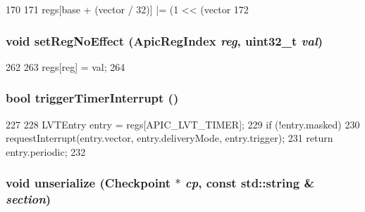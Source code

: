 \begin{DoxyCode}
170     {
171         regs[base + (vector / 32)] |= (1 << (vector %
172     }
\end{DoxyCode}
\hypertarget{classX86ISA_1_1Interrupts_aa35a02e092cafc6be88b0eb6afe22937}{
\subsubsection[{setRegNoEffect}]{\setlength{\rightskip}{0pt plus 5cm}void setRegNoEffect ({\bf ApicRegIndex} {\em reg}, \/  {\bf uint32\_\-t} {\em val})}}
\label{classX86ISA_1_1Interrupts_aa35a02e092cafc6be88b0eb6afe22937}



\begin{DoxyCode}
262     {
263         regs[reg] = val;
264     }
\end{DoxyCode}
\hypertarget{classX86ISA_1_1Interrupts_a07d266f0ad36cfec987f7487aa2c54cc}{
\subsubsection[{triggerTimerInterrupt}]{\setlength{\rightskip}{0pt plus 5cm}bool triggerTimerInterrupt ()}}
\label{classX86ISA_1_1Interrupts_a07d266f0ad36cfec987f7487aa2c54cc}



\begin{DoxyCode}
227     {
228         LVTEntry entry = regs[APIC_LVT_TIMER];
229         if (!entry.masked)
230             requestInterrupt(entry.vector, entry.deliveryMode, entry.trigger);
231         return entry.periodic;
232     }
\end{DoxyCode}
\hypertarget{classX86ISA_1_1Interrupts_af22e5d6d660b97db37003ac61ac4ee49}{
\subsubsection[{unserialize}]{\setlength{\rightskip}{0pt plus 5cm}void unserialize ({\bf Checkpoint} $\ast$ {\em cp}, \/  const std::string \& {\em section})}}
\label{classX86ISA_1_1Interrupts_af22e5d6d660b97db37003ac61ac4ee49}


